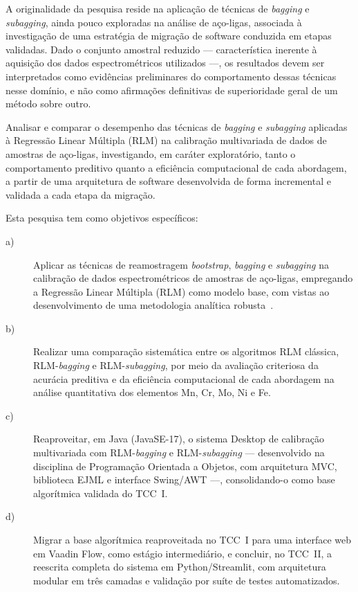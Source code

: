 A originalidade da pesquisa reside na aplicação de técnicas de \textit{bagging} e
\textit{subagging}, ainda pouco exploradas na análise de aço-ligas, associada à investigação
de uma estratégia de migração de software conduzida em etapas validadas. Dado o conjunto
amostral reduzido — característica inerente à aquisição dos dados espectrométricos
utilizados —, os resultados devem ser interpretados como evidências preliminares do
comportamento dessas técnicas nesse domínio, e não como afirmações definitivas de
superioridade geral de um método sobre outro.

Analisar e comparar o desempenho das técnicas de \textit{bagging} e \textit{subagging}
aplicadas à Regressão Linear Múltipla (RLM) na calibração multivariada de dados de amostras
de aço-ligas, investigando, em caráter exploratório, tanto o comportamento preditivo quanto
a eficiência computacional de cada abordagem, a partir de uma arquitetura de software
desenvolvida de forma incremental e validada a cada etapa da migração.

Esta pesquisa tem como objetivos específicos:
\begin{description}
    \item[a)] Aplicar as técnicas de reamostragem \textit{bootstrap}, \textit{bagging} e
    \textit{subagging} na calibração de dados espectrométricos de amostras de aço-ligas,
    empregando a Regressão Linear Múltipla (RLM) como modelo base, com vistas ao
    desenvolvimento de uma metodologia analítica robusta~\cite{Canty2001,rathnayake2022}.

    \item[b)] Realizar uma comparação sistemática entre os algoritmos RLM clássica,
    RLM-\textit{bagging} e RLM-\textit{subagging}, por meio da avaliação criteriosa da
    acurácia preditiva e da eficiência computacional de cada abordagem na análise
    quantitativa dos elementos Mn, Cr, Mo, Ni e Fe.

    \item[c)] Reaproveitar, em Java (JavaSE-17), o sistema Desktop de calibração
    multivariada com RLM-\textit{bagging} e RLM-\textit{subagging} — desenvolvido na
    disciplina de Programação Orientada a Objetos, com arquitetura MVC, biblioteca EJML e
    interface Swing/AWT —, consolidando-o como base algorítmica validada do TCC~I.

    \item[d)] Migrar a base algorítmica reaproveitada no TCC~I para uma interface web em
    Vaadin Flow, como estágio intermediário, e concluir, no TCC~II, a reescrita completa do
    sistema em Python/Streamlit, com arquitetura modular em três camadas e validação por
    suíte de testes automatizados.
\end{description}

